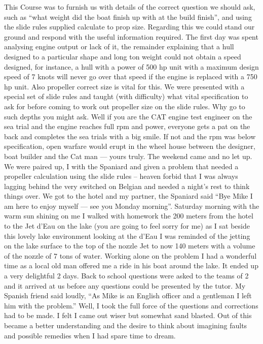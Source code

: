 \here
This Course was to furnish us with details of the correct question we should
ask, such as ``what weight did the boat finish up with at the build finish'', and
using the slide rules supplied calculate to prop size. Regarding this we
could stand our ground and respond with the useful information required.
The first day was spent analysing engine output or lack of it, the remainder
explaining that a hull designed to a particular shape and long ton weight could
not obtain a speed designed, for instance, a hull with a power of 500 hp unit
with a maximum design speed of 7 knots will never go over that speed if the
engine is replaced with a 750 hp unit. Also propeller correct size is vital
for this. We were presented with a special set of slide rules and taught
(with difficulty) what vital specification to ask for before coming to work out
propeller size on the slide rules. Why go to such depths you might ask. Well
if you are the CAT engine test engineer on the sea trial and the engine reaches
full rpm and power, everyone gets a pat on the back and completes the sea
trials with a big smile. If not and the rpm was below specification, open
warfare would erupt in the wheel house between the designer, boat builder and
the Cat man --- yours truly.
The weekend came and no let up. We were paired up, I with the Spaniard and
given a problem that needed a propeller calculation using the slide rules –
heaven forbid that I was always lagging behind the very switched on Belgian
and needed a night's rest to think things over. We got to the hotel and my
partner, the Spaniard said ``Bye Mike I am here to enjoy myself --- see you
Monday morning''.
Saturday morning with the warm sun shining on me I walked with homework the 200
meters from the hotel to the Jet d'Eau on the lake (you are going to feel sorry
for me) as I sat beside this lovely lake environment looking at the d'Eau I was
reminded of the jetting on the lake surface to the top of the nozzle Jet to now
140 meters with a volume of the nozzle of 7 tons of water. Working alone on
the problem I had a wonderful time as a local old man offered me a ride in his
boat around the lake. It ended up a very delightful 2 days. Back to school
questions were asked to the teams of 2 and it arrived at us before any
questions could be presented by the tutor. My Spanish friend said loudly, ``As
Mike is an English officer and a gentleman I left him with the problem.'' Well,
I took the full force of the questions and corrections had to be made. I felt
I came out wiser but somewhat sand blasted.
Out of this became a better understanding and the desire to think about
imagining faults and possible remedies when I had spare time to dream.
